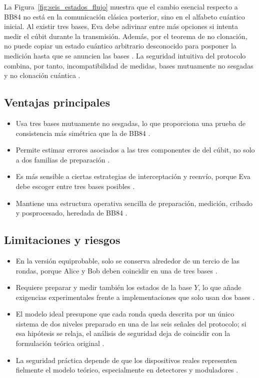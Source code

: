 La Figura~\ref{fig:seis_estados_flujo} muestra que el cambio esencial respecto a BB84 no está en la comunicación clásica posterior, sino en el alfabeto cuántico inicial. Al existir tres bases, Eva debe adivinar entre más opciones si intenta medir el cúbit durante la transmisión. Además, por el teorema de no clonación, no puede copiar un estado cuántico arbitrario desconocido para posponer la medición hasta que se anuncien las bases \citep{wootters1982}. La seguridad intuitiva del protocolo combina, por tanto, incompatibilidad de medidas, bases mutuamente no sesgadas y no clonación cuántica \citep{pauli1927,schwinger1960,wootters1982,bruss1998}.


\subsection{Ventajas principales}
\begin{itemize}
    \item Usa tres bases mutuamente no sesgadas, lo que proporciona una prueba de consistencia más simétrica que la de BB84 \citep{schwinger1960,bruss1998}.
    \item Permite estimar errores asociados a las tres componentes de \cite{pauli1927} del cúbit, no solo a dos familias de preparación \citep{bruss1998}.
    \item Es más sensible a ciertas estrategias de interceptación y reenvío, porque Eva debe escoger entre tres bases posibles \citep{bennett1984,bruss1998}.
    \item Mantiene una estructura operativa sencilla de preparación, medición, cribado y posprocesado, heredada de BB84 \citep{bennett1984}.
\end{itemize}

\subsection{Limitaciones y riesgos}
\begin{itemize}
    \item En la versión equiprobable, solo se conserva alrededor de un tercio de las rondas, porque Alice y Bob deben coincidir en una de tres bases \citep{bruss1998}.
    \item Requiere preparar y medir también los estados de la base $Y$, lo que añade exigencias experimentales frente a implementaciones que solo usan dos bases \citep{pauli1927,bruss1998}.
    \item El modelo ideal presupone que cada ronda queda descrita por un único sistema de dos niveles preparado en una de las seis señales del protocolo; si esa hipótesis se relaja, el análisis de seguridad deja de coincidir con la formulación teórica original \citep{bennett1984,bruss1998}.
    \item La seguridad práctica depende de que los dispositivos reales representen fielmente el modelo teórico, especialmente en detectores y moduladores \citep{bruss1998,bechmann1999}.
\end{itemize}

